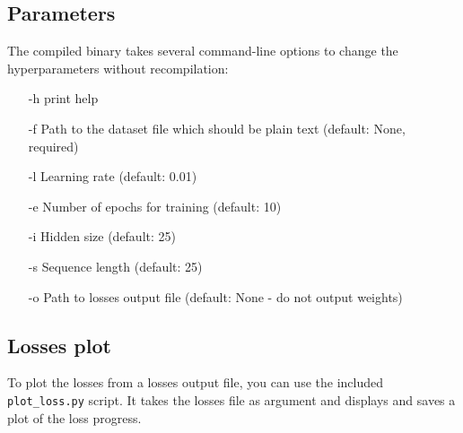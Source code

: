 \documentclass[11pt]{article}
\begin{document}
	\subsection{Parameters}
		The compiled binary takes several command-line options to change the hyperparameters without recompilation:
		\begin{itemize}
			\item[-h] print help
			\item[-f] Path to the dataset file which should be plain text (default: None, required)
			\item[-l] Learning rate (default: 0.01)
			\item[-e] Number of epochs for training (default: 10)
			\item[-i] Hidden size (default: 25)
			\item[-s] Sequence length (default: 25)
			\item[-o] Path to losses output file (default: None - do not output weights)
		\end{itemize}
	
	\subsection{Losses plot}
		To plot the losses from a losses output file, you can use the included \texttt{plot\_loss.py} script. It takes the losses file as argument and displays and saves a plot of the loss progress.
\end{document}
